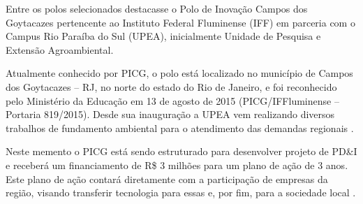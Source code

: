 Entre os polos selecionados destacasse o Polo de Inovação Campos dos Goytacazes pertencente ao Instituto Federal Fluminense (IFF) em parceria com o Campus Rio Paraíba do Sul (UPEA), inicialmente Unidade de Pesquisa e Extensão Agroambiental.

Atualmente conhecido por PICG, o polo está localizado no município de Campos dos Goytacazes – RJ, no norte do estado do Rio de Janeiro, e foi reconhecido pelo Ministério da Educação em 13 de agosto de 2015 (PICG/IFFluminense – Portaria 819/2015). Desde sua inauguração a UPEA vem  realizando diversos trabalhos de fundamento ambiental para o atendimento das demandas regionais \cite{embrapiiff}.

Neste memento o PICG está sendo estruturado para desenvolver projeto de PD\&I e receberá um financiamento de R\$ 3 milhões para um plano de ação de 3 anos. Este plano de ação contará diretamente com a participação de empresas da região, visando transferir tecnologia para essas e, por fim, para a sociedade local \cite{embrapiiff}.
